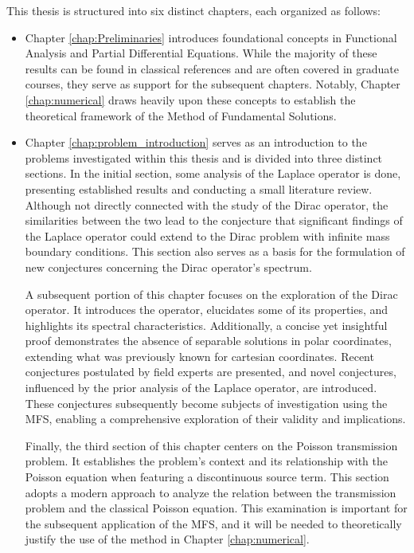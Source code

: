 This thesis is structured into six distinct chapters, each organized as follows:
\begin{itemize}
\item Chapter \ref{chap:Preliminaries} introduces foundational concepts in Functional Analysis and Partial Differential Equations. While the majority of these results can be found in classical references and are often covered in graduate courses, they serve as support for the subsequent chapters. Notably, Chapter \ref{chap:numerical} draws heavily upon these concepts to establish the theoretical framework of the Method of Fundamental Solutions. 

\item Chapter \ref{chap:problem_introduction} serves as an introduction to the problems investigated within this thesis and is divided into three distinct sections. In the initial section, some analysis of the Laplace operator is done, presenting established results and conducting a small literature review. Although not directly connected with the study of the Dirac operator, the similarities between the two lead to the conjecture that significant findings of the Laplace operator could extend to the Dirac problem with infinite mass boundary conditions. This section also serves as a basis for the formulation of new conjectures concerning the Dirac operator's spectrum.

A subsequent portion of this chapter focuses on the exploration of the Dirac operator. It introduces the operator, elucidates some of its properties, and highlights its spectral characteristics. Additionally, a concise yet insightful proof demonstrates the absence of separable solutions in polar coordinates, extending what was previously known for cartesian coordinates. Recent conjectures postulated by field experts are presented, and novel conjectures, influenced by the prior analysis of the Laplace operator, are introduced. These conjectures subsequently become subjects of investigation using the \ac{MFS}, enabling a comprehensive exploration of their validity and implications.

Finally, the third section of this chapter centers on the Poisson transmission problem. It establishes the problem's context and its relationship with the Poisson equation when featuring a discontinuous source term. This section adopts a modern approach to analyze the relation between the transmission problem and the classical Poisson equation. This examination is important for the subsequent application of the \ac{MFS}, and it will be needed to theoretically justify the use of the method in Chapter \ref{chap:numerical}.


\end{itemize}
